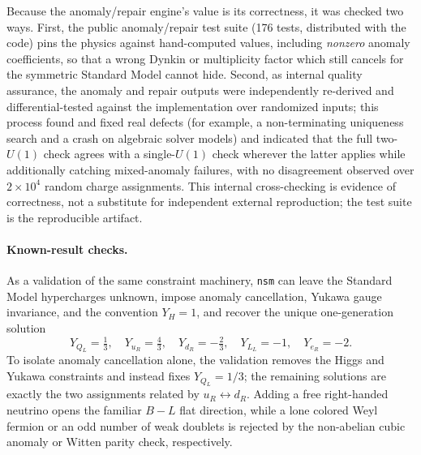 \documentclass[11pt]{article}
\newcommand{\nsm}{\texttt{nsm}}
\begin{document}
Because the anomaly/repair engine's value is its correctness, it was checked two
ways. First, the public anomaly/repair test suite (176 tests, distributed with
the code) pins the physics
against hand-computed values, including \emph{nonzero} anomaly coefficients, so
that a wrong Dynkin or multiplicity factor which still cancels for the symmetric
Standard Model cannot hide. Second, as internal quality assurance, the anomaly
and repair outputs were independently re-derived and differential-tested against
the implementation over randomized inputs; this process found and fixed real
defects (for example, a non-terminating uniqueness search and a crash on
algebraic solver models) and indicated that the full two-$U(1)$ check agrees
with a single-$U(1)$ check wherever the latter applies while additionally
catching mixed-anomaly failures, with no disagreement observed over
$2\times10^{4}$ random charge assignments. This internal cross-checking is
evidence of correctness, not a substitute for independent external reproduction;
the test suite is the reproducible artifact.

\paragraph{Known-result checks.}
As a validation of the same constraint machinery, \nsm{} can leave the Standard
Model hypercharges unknown, impose anomaly cancellation, Yukawa gauge
invariance, and the convention $Y_H=1$, and recover the unique one-generation
solution
\[
Y_{Q_L}=\tfrac13,\quad Y_{u_R}=\tfrac43,\quad Y_{d_R}=-\tfrac23,\quad
Y_{L_L}=-1,\quad Y_{e_R}=-2 .
\]
To isolate anomaly cancellation alone, the validation removes the Higgs and Yukawa
constraints and instead fixes $Y_{Q_L}=1/3$; the remaining solutions are exactly
the two assignments related by $u_R\!\leftrightarrow d_R$. Adding a free
right-handed neutrino opens the familiar $B\!-\!L$ flat direction, while a lone
colored Weyl fermion or an odd number of weak doublets is rejected by the
non-abelian cubic anomaly or Witten parity check, respectively.
\end{document}
